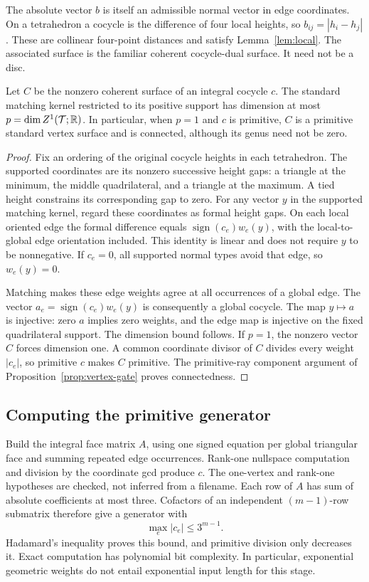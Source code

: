 The absolute vector $b$ is itself an admissible normal vector in edge
coordinates. On a tetrahedron a cocycle is the difference of four local
heights, so $b_{ij}=|h_i-h_j|$. These are collinear four-point distances
and satisfy Lemma~\ref{lem:local}. The associated surface is the familiar
coherent cocycle-dual surface. It need not be a disc.

\begin{lemma}
\label{lem:coherent-rank}
Let $C$ be the nonzero coherent surface of an integral cocycle $c$.
The standard matching kernel restricted to its positive support has
dimension at most $p=\dim Z^1(\mathcal T;\mathbb R)$. In particular, when $p=1$ and
$c$ is primitive, $C$ is a primitive standard vertex surface and is
connected, although its genus need not be zero.
\end{lemma}
\begin{proof}
Fix an ordering of the original cocycle heights in each tetrahedron.
The supported coordinates are its nonzero successive height gaps: a
triangle at the minimum, the middle quadrilateral, and a triangle at
the maximum. A tied height constrains its corresponding gap to zero.
For any vector $y$ in the supported matching kernel, regard these
coordinates as formal height gaps. On each local oriented edge the
formal difference equals $\operatorname{sign}(c_e)w_e(y)$, with the
local-to-global edge orientation included. This identity is linear and
does not require $y$ to be nonnegative. If $c_e=0$, all supported normal
types avoid that edge, so $w_e(y)=0$.

Matching makes these edge weights agree at all occurrences of a global
edge. The vector $a_e=\operatorname{sign}(c_e)w_e(y)$ is consequently
a global cocycle. The map $y\mapsto a$ is injective: zero $a$ implies
zero weights, and the edge map is injective on the fixed quadrilateral
support. The dimension bound follows. If $p=1$, the nonzero vector $C$
forces dimension one. A common coordinate divisor of $C$ divides every
weight $|c_e|$, so primitive $c$ makes $C$ primitive. The primitive-ray
component argument of Proposition~\ref{prop:vertex-gate} proves
connectedness.
\end{proof}

\subsection{Computing the primitive generator}

Build the integral face matrix $A$, using one signed equation per global
triangular face and summing repeated edge occurrences. Rank-one nullspace
computation and division by the coordinate gcd produce $c$. The one-vertex
and rank-one hypotheses are checked, not inferred from a filename. Each
row of $A$ has sum of absolute coefficients at most three. Cofactors of
an independent $(m-1)$-row submatrix therefore give a generator with
\[
                    \max_e|c_e|\le3^{m-1}.                \tag{6}\label{eq:cbound}
\]
Hadamard's inequality proves this bound, and primitive division only
decreases it. Exact computation has polynomial bit complexity. In
particular, exponential geometric weights do not entail exponential
input length for this stage.

